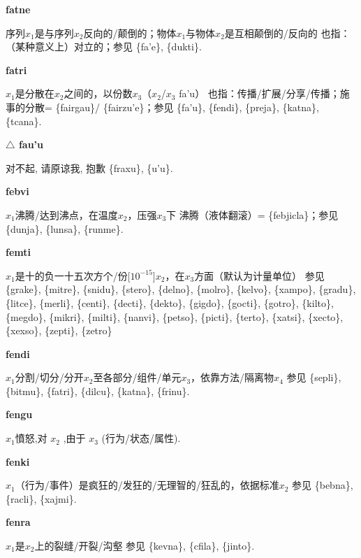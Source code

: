 \documentclass[notitlepage,twocolumn,a4paper,10pt]{book}
\begin{document}
{\sffamily\bfseries fatne}\enspace {\ttfamily\bfseries[fat     fa'e]}  序列$x_1$是与序列$x_2$反向的\slash{}颠倒的；物体$x_1$与物体$x_2$是互相颠倒的\slash{}反向的 \textemdash{} 也指：（某种意义上）对立的；参见 \{fa'e\}, \{dukti\}.

{\sffamily\bfseries fatri}\enspace {\ttfamily\bfseries[        fai]}  $x_1$是分散在$x_2$之间的，以份数$x_3$（$x_2$\slash{}$x_3$ fa'u） \textemdash{} 也指：传播\slash{}扩展\slash{}分享\slash{}传播；施事的分散= \{fairgau\}\slash{} \{fairzu'e\}；参见 \{fa'u\}, \{fendi\}, \{preja\}, \{katna\}, \{tcana\}.

{\sffamily\bfseries $\triangle$ fau'u}\enspace {\sffamily\bfseries[COI]}  对不起, 请原谅我, 抱歉 \textemdash{} \{fraxu\}, \{u'u\}.

{\sffamily\bfseries febvi}\enspace {\ttfamily\bfseries[feb]}  $x_1$沸腾\slash{}达到沸点，在温度$x_2$，压强$x_3$下 \textemdash{} 沸腾（液体翻滚）= \{febjicla\}；参见 \{dunja\}, \{lunsa\}, \{runme\}.

{\sffamily\bfseries femti}\enspace {\ttfamily\bfseries[fem]}  $x_1$是十的负一十五次方个\slash{}份[$10^{-15}$]$x_2$，在$x_3$方面（默认为计量单位） \textemdash{} 参见 \{grake\}, \{mitre\}, \{snidu\}, \{stero\}, \{delno\}, \{molro\}, \{kelvo\}, \{xampo\}, \{gradu\}, \{litce\}, \{merli\}, \{centi\}, \{decti\}, \{dekto\}, \{gigdo\}, \{gocti\}, \{gotro\}, \{kilto\}, \{megdo\}, \{mikri\}, \{milti\}, \{nanvi\}, \{petso\}, \{picti\}, \{terto\}, \{xatsi\}, \{xecto\}, \{xexso\}, \{zepti\}, \{zetro\}

{\sffamily\bfseries fendi}\enspace {\ttfamily\bfseries[fed]}  $x_1$分割\slash{}切分\slash{}分开$x_2$至各部分\slash{}组件\slash{}单元$x_3$，依靠方法\slash{}隔离物$x_4$ \textemdash{} 参见 \{sepli\}, \{bitmu\}, \{fatri\}, \{dilcu\}, \{katna\}, \{frinu\}.

{\sffamily\bfseries fengu}\enspace {\ttfamily\bfseries[feg     fe'u]}  $x_1$憤怒,对 $x_2$ ,由于 $x_3$ (行为\slash{}状态\slash{}属性).

{\sffamily\bfseries fenki}\enspace {\ttfamily\bfseries[fek]}  $x_1$（行为\slash{}事件）是疯狂的\slash{}发狂的\slash{}无理智的\slash{}狂乱的，依据标准$x_2$ \textemdash{} 参见 \{bebna\}, \{racli\}, \{xajmi\}.

{\sffamily\bfseries fenra}\enspace {\ttfamily\bfseries[fer     fe'a]}  $x_1$是$x_2$上的裂缝\slash{}开裂\slash{}沟壑 \textemdash{} 参见 \{kevna\}, \{cfila\}, \{jinto\}.
\end{document}
